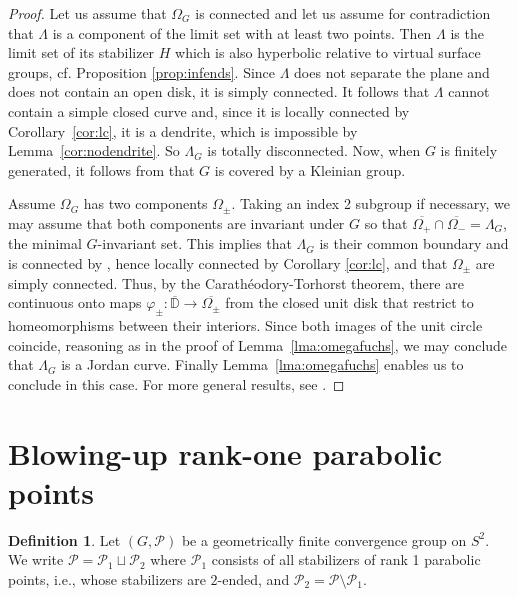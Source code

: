 \documentclass[11pt]{article}
\theoremstyle{definition}
\newtheorem{definition}[theorem]{Definition}
\newcommand\PP{\mathcal{P}}
\begin{document}
\begin{proof} Let us assume that $\Omega_G$ is connected and let us assume for contradiction that $\Lambda$ is a component of the limit set with at least two points. Then $\Lambda$ is the limit set of 
its stabilizer $H$ which is also hyperbolic relative to virtual surface groups, cf. Proposition \ref{prop:infends}. Since $\Lambda$ 
does not separate the plane and does not contain an open disk, it is
simply connected. It follows that $\Lambda$ cannot contain a simple closed curve and, since it is locally connected by Corollary~\ref{cor:lc}, it is a dendrite, which is impossible by Lemma~\ref{cor:nodendrite}.
So $\Lambda_G$ is totally disconnected. Now, when $G$ is finitely generated, it follows from \cite[Corollary 5.4]{martin:skora} that $G$ is covered by a Kleinian group.


Assume $\Omega_G$ has two components $\Omega_\pm$.  Taking an index 2 subgroup if necessary, we may assume that both components
are invariant under $G$ so that $\overline{\Omega_+} \cap \overline{\Omega_-}=\Lambda_G$, the minimal $G$-invariant set.   This implies that $\Lambda_G$ is  their common boundary and is connected by \cite[Cor.\,VI.2.11]{whyburnantop}, 
hence locally connected
by Corollary \ref{cor:lc}, and that $\Omega_\pm$ are simply connected.
Thus, by the Carath\'eodory-Torhorst theorem, there are continuous onto maps $\varphi_\pm:\overline{\mathbb{D}}\to \overline{\Omega_\pm}$ from
the closed unit disk that restrict to homeomorphisms between their interiors. Since both images of the unit circle coincide, 
reasoning as in the proof of Lemma~\ref{lma:omegafuchs}, we may conclude that $\Lambda_G$ is a Jordan curve. Finally Lemma~\ref{lma:omegafuchs} enables us to conclude in this case.
For more general results, see \cite{martin:tukia:invpairs}.
\end{proof}





\section{Blowing-up rank-one parabolic points}\label{sec:blow}


\begin{definition} \label{def:parabolicsplit} Let $(G,\PP)$ be a geometrically finite convergence group on $S^2$. We write
$\PP=\PP_1\sqcup \PP_2$ where $\PP_1$ consists of all stabilizers of rank 1 parabolic points, i.e., whose stabilizers are $2$-ended, and $\PP_2=\PP\setminus\PP_1$. \end{definition} 
\end{document}
